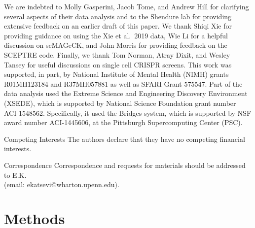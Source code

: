 \documentclass{nature}
\begin{document}
\begin{addendum}
 \item We are indebted to Molly Gasperini, Jacob Tome, and Andrew Hill for clarifying several aspects of their data analysis\cite{Gasperini2019} and to the Shendure lab for providing extensive feedback on an earlier draft of this paper. We thank Shiqi Xie for providing guidance on using the Xie et al.\ 2019 data, Wie Li for a helpful discussion on scMAGeCK, and John Morris for providing feedback on the SCEPTRE code. Finally, we thank Tom Norman, Atray Dixit, and Wesley Tansey for useful discussions on single cell CRISPR screens. This work was supported, in part, by National Institute of Mental Health (NIMH) grants R01MH123184 and R37MH057881 as well as SFARI Grant 575547. Part of the data analysis used the Extreme Science and Engineering Discovery Environment (XSEDE),\cite{XSEDE} which is supported by National Science Foundation grant number ACI-1548562. Specifically, it used the Bridges system,\cite{Bridges} which is supported by NSF award number ACI-1445606, at the Pittsburgh Supercomputing Center (PSC). \item[Competing Interests] The authors declare that they have no
competing financial interests.
 \item[Correspondence] Correspondence and requests for materials
should be addressed to E.K. \\ (email: ekatsevi@wharton.upenn.edu).
\end{addendum}

\clearpage
\section*{Methods}
\end{document}
